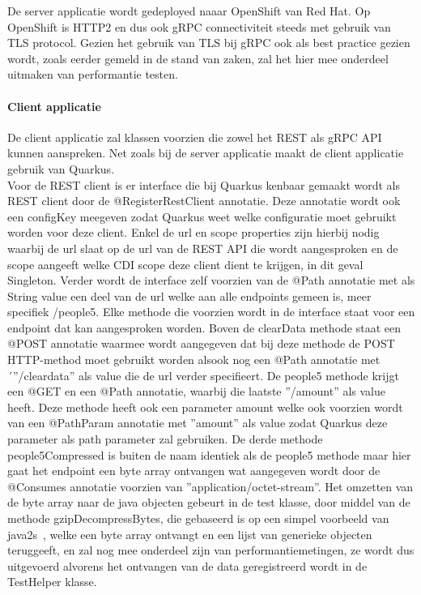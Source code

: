 De server applicatie wordt gedeployed naaar OpenShift van Red Hat. Op OpenShift is HTTP2 en dus ook gRPC connectiviteit steeds met gebruik van TLS protocol.
Gezien het gebruik van TLS bij gRPC ook als best practice gezien wordt, zoals eerder gemeld in de stand van zaken, zal het hier mee onderdeel uitmaken van performantie testen.\newline
~\autocite{openshifttls}

\paragraph{Client applicatie}

De client applicatie zal klassen voorzien die zowel het REST als gRPC API kunnen aanspreken.
Net zoals bij de server applicatie maakt de client applicatie gebruik van Quarkus.\\

Voor de REST client is er interface die bij Quarkus kenbaar gemaakt wordt als REST client door de @RegisterRestClient annotatie. Deze annotatie wordt ook een configKey meegeven
zodat Quarkus weet welke configuratie moet gebruikt worden voor deze client.  Enkel de url en scope properties zijn hierbij nodig waarbij de url slaat op de url van de
REST API die wordt aangesproken en de scope aangeeft welke CDI scope deze client dient te krijgen, in dit geval Singleton.
Verder wordt de interface zelf voorzien van de @Path annotatie met als String value een deel van de url welke
aan alle endpoints gemeen is, meer specifiek /people5. Elke methode die voorzien wordt in de interface staat voor een endpoint dat kan aangesproken worden.
Boven de clearData methode staat een @POST annotatie waarmee wordt aangegeven dat bij deze methode de POST HTTP-method moet gebruikt worden alsook
nog een @Path annotatie met ´''/cleardata'' als value die de url verder specifieert. De people5 methode krijgt een @GET en een @Path annotatie, waarbij die laatste ''/{amount}''
als value heeft. Deze methode heeft ook een parameter amount welke ook voorzien wordt van een @PathParam annotatie met ''amount'' als value zodat Quarkus
deze parameter als path parameter zal gebruiken. De derde methode people5Compressed is buiten de naam identiek als de people5 methode maar hier gaat het endpoint een
byte array ontvangen wat aangegeven wordt door de @Consumes annotatie voorzien van ''application/octet-stream''. Het omzetten van de byte array naar de java objecten gebeurt
in de test klasse, door middel van de methode gzipDecompressBytes, die gebaseerd is op een simpel voorbeeld van java2s~\parencite{gzipDecompressie}, welke een byte array ontvangt en een lijst van generieke objecten teruggeeft,
en zal nog mee onderdeel zijn van performantiemetingen, ze wordt dus uitgevoerd alvorens het ontvangen van de data geregistreerd wordt in de TestHelper klasse.
~\autocite{quarkusRESTclient}\\

